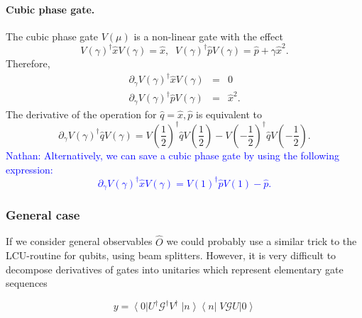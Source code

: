 \documentclass[aps,pra,10pt,twocolumn,groupedaddress,nofootinbib]{revtex4-1}
\theoremstyle{plain}
\newcommand{\ket}[1]{\ensuremath{\left| #1 \right \rangle}}
\newcommand{\bra}[1]{\ensuremath{\left \langle #1 \right |}}
\newcommand{\ketbra}[2]{\ket{#1}\bra{#2}}
\newcommand{\x}{\hat{x}}
\newcommand{\p}{\hat{p}}
\newcommand{\G}{\mathcal{G}}
\newcommand{\nathan}[1]{\textcolor{blue}{Nathan: #1}}
\begin{document}
\paragraph{Cubic phase gate.}
The cubic phase gate $V(\mu)$ is a non-linear gate with the effect
\[V(\gamma)^{\dagger} \x V(\gamma) = \x, \;\; V(\gamma)^{\dagger} \p V(\gamma) = \p + \gamma \x^2. \]
Therefore, 
\begin{eqnarray}
\partial_{\gamma} V(\gamma)^{\dagger} \x V(\gamma) &=& 0\\
\partial_{\gamma} V(\gamma)^{\dagger} \p V(\gamma) &=& \x^2.
\end{eqnarray} 
The derivative of the operation for $\hat{q} = \x, \p$ is equivalent to 
\[ \partial_{\gamma} V(\gamma)^{\dagger} \hat{q} V(\gamma) =   V\left(\frac{1}{2} \right)^{\dagger} \hat{q} V \left(\frac{1}{2} \right) - V \left(-\frac{1}{2} \right)^{\dagger} \hat{q} V\left(-\frac{1}{2} \right). \]
\nathan{Alternatively, we can save a cubic phase gate by using the following expression:
\[ \partial_{\gamma} V(\gamma)^{\dagger} \hat{x} V(\gamma) =   V\left(1 \right)^{\dagger} \hat{p} V \left(1 \right) -  \hat{p}.
\]
}



\subsubsection{General case}

If we consider general observables $\hat{O}$ we could probably use a similar trick to the LCU-routine for qubits, using beam splitters. However, it is very difficult to decompose derivatives of gates into unitaries which represent elementary gate sequences 

\[ y = \bra{0}U^{\dagger} \G^{\dagger} V^{\dagger} \; \ketbra{n}{n} \; V \G U \ket{0} \]
\end{document}
